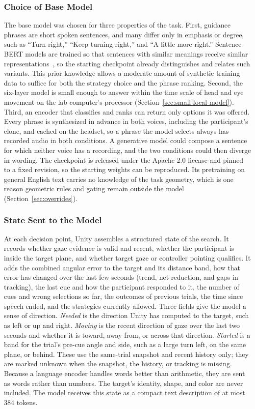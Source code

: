 \subsubsection{Choice of Base Model}
The base model was chosen for three properties of the task. First, guidance phrases are short spoken sentences, and many differ only in emphasis or degree, such as ``Turn right,'' ``Keep turning right,'' and ``A little more right.'' Sentence-BERT models are trained so that sentences with similar meanings receive similar representations~\cite{reimers2019sbert}, so the starting checkpoint already distinguishes and relates such variants. This prior knowledge allows a moderate amount of synthetic training data to suffice for both the strategy choice and the phrase ranking. Second, the six-layer model is small enough to answer within the time scale of head and eye movement on the lab computer's processor (Section~\ref{sec:small-local-model}). Third, an encoder that classifies and ranks can return only options it was offered. Every phrase is synthesized in advance in both voices, including the participant's clone, and cached on the headset, so a phrase the model selects always has recorded audio in both conditions. A generative model could compose a sentence for which neither voice has a recording, and the two conditions could then diverge in wording. The checkpoint is released under the Apache-2.0 license and pinned to a fixed revision, so the starting weights can be reproduced. Its pretraining on general English text carries no knowledge of the task geometry, which is one reason geometric rules and gating remain outside the model (Section~\ref{sec:overrides}).

\subsubsection{State Sent to the Model}
At each decision point, Unity assembles a structured state of the search. It records whether gaze evidence is valid and recent, whether the participant is inside the target plane, and whether target gaze or controller pointing qualifies. It adds the combined angular error to the target and its distance band, how that error has changed over the last few seconds (trend, net reduction, and gaps in tracking), the last cue and how the participant responded to it, the number of cues and wrong selections so far, the outcomes of previous trials, the time since speech ended, and the strategies currently allowed. Three fields give the model a sense of direction. \emph{Needed} is the direction Unity has computed to the target, such as left or up and right. \emph{Moving} is the recent direction of gaze over the last two seconds and whether it is toward, away from, or across that direction. \emph{Started} is a band for the trial's pre-cue angle and side, such as a large turn left, on the same plane, or behind. These use the same-trial snapshot and recent history only; they are marked unknown when the snapshot, the history, or tracking is missing. Because a language encoder handles words better than arithmetic, they are sent as words rather than numbers. The target's identity, shape, and color are never included. The model receives this state as a compact text description of at most 384 tokens.

